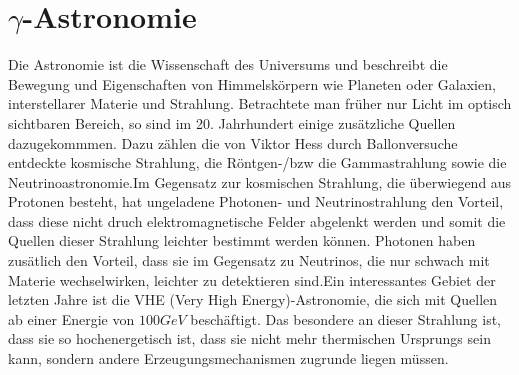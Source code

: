 \chapter{$\gamma$-Astronomie} 
\label{ch:gamma}
Die Astronomie ist die Wissenschaft des Universums und beschreibt die Bewegung und Eigenschaften von Himmelskörpern wie Planeten oder Galaxien, interstellarer Materie und Strahlung. Betrachtete man früher nur Licht im optisch sichtbaren Bereich, so sind im 20. Jahrhundert einige zusätzliche Quellen dazugekommmen. Dazu zählen die von Viktor Hess durch Ballonversuche entdeckte kosmische Strahlung, die Röntgen-/bzw die Gammastrahlung sowie die Neutrinoastronomie.Im Gegensatz zur kosmischen Strahlung, die überwiegend aus Protonen besteht, hat ungeladene Photonen- und Neutrinostrahlung den Vorteil, dass diese nicht druch elektromagnetische Felder abgelenkt werden und somit die Quellen dieser Strahlung leichter bestimmt werden können. Photonen haben zusätlich den Vorteil, dass sie im Gegensatz zu Neutrinos, die nur schwach mit Materie wechselwirken, leichter zu detektieren sind.Ein interessantes Gebiet der letzten Jahre ist die VHE (Very High Energy)-Astronomie, die sich mit Quellen ab einer Energie von $100 \unit{GeV}$ \cite{DesignConcept} beschäftigt. Das besondere an dieser Strahlung ist, dass sie so hochenergetisch ist, dass sie nicht mehr thermischen Ursprungs sein kann, sondern andere Erzeugungsmechanismen zugrunde liegen müssen.

